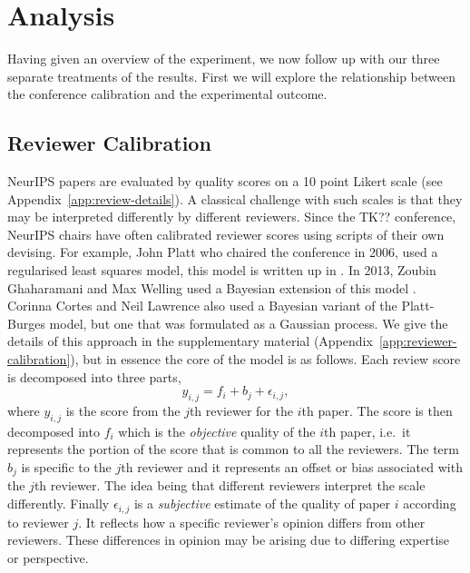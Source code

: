 \documentclass[twoside]{article}
\newcommand\cc[1]{{\color{red}#1}}
\begin{document}
\section{Analysis}
Having given an overview of the experiment, we now follow up with our
three separate treatments of the results. First we will explore the
relationship between the conference calibration and the experimental
outcome.

\subsection{Reviewer Calibration}
\label{sec:calibration}
NeurIPS papers are evaluated by quality scores on a 10 point Likert
scale (see Appendix~\ref{app:review-details}). A
classical challenge with such scales is that they may be interpreted
differently by different reviewers. Since the TK\cc{??} conference, NeurIPS
chairs have often calibrated reviewer scores using scripts of their
own devising. For example, John Platt who chaired the conference in
2006, used a regularised least squares model, this model is written up
in \cite{Platt-calibration12}. In 2013, Zoubin Ghaharamani
and Max Welling used a Bayesian extension of this model
\cite{Ge-bayesian15}. Corinna Cortes and Neil Lawrence also used a
Bayesian variant of the Platt-Burges model, but one that was
formulated as a Gaussian process. We give the details of this approach
in the supplementary material (Appendix~\ref{app:reviewer-calibration}),
but in essence the core of the model is as follows. Each review score
is decomposed into three parts,
$$
y_{i,j} = f_i + b_j + \epsilon_{i, j},
$$
where $y_{i,j}$ is the score from the $j$th reviewer for the $i$th
paper. The score is then decomposed into $f_i$ which is the
\emph{objective} quality of the $i$th paper, i.e.\ it represents the
portion of the score that is common to all the reviewers. The term
$b_j$ is specific to the $j$th reviewer and it represents an offset or
bias associated with the $j$th reviewer. The idea being that different
reviewers interpret the scale differently. Finally $\epsilon_{i,j}$ is
a \emph{subjective} estimate of the quality of paper $i$ according to
reviewer $j$. It reflects how a specific reviewer's opinion differs
from other reviewers. These differences in opinion may be arising due
to differing expertise or perspective.
\end{document}
